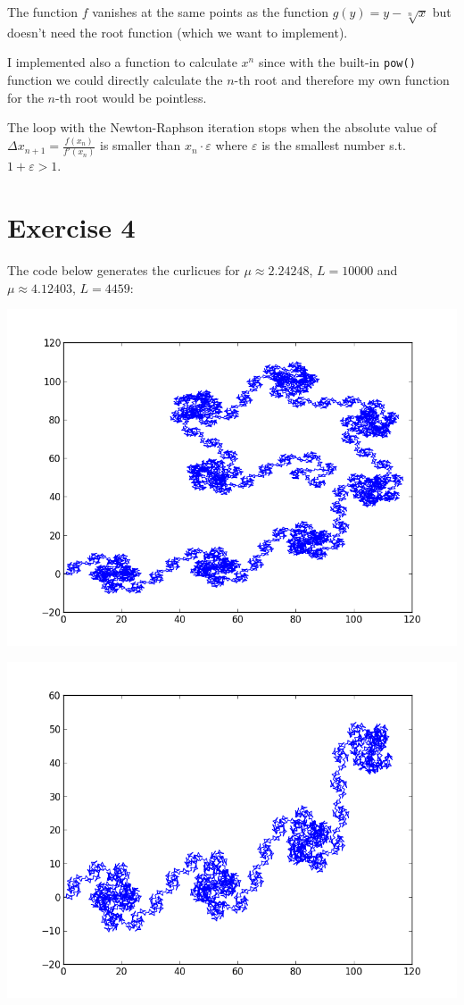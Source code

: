 \documentclass[%
]
{scrartcl}
\theoremstyle{plain}
\begin{document}
The function $f$ vanishes at the same points as the function $g(y)=y-\sqrt[n]{x}$ but doesn't need the root function (which we want to implement).

I implemented also a function to calculate $x^{n}$ since with the built-in \texttt{pow()} function we could directly calculate the $n$-th root and therefore my own function for the $n$-th root would be pointless.

The loop with the Newton-Raphson iteration stops when the absolute value of $\Delta x_{n+1}=\frac{f(x_{n})}{f'(x_{n})}$ is smaller than $x_{n}\cdot\varepsilon$ where $\varepsilon$ is the smallest number s.t. $1+\varepsilon>1$.



\section*{Exercise 4}

The code below generates the curlicues for $\mu\approx 2.24248$, $L=10000$ and $\mu\approx 4.12403$, $L=4459$:



\begin{center}
\includegraphics[width=0.6\linewidth]{../curlicue01.png}
\end{center}

\begin{center}
\centering
\includegraphics[width=0.6\linewidth]{../curlicue02.png}
\end{center}
\end{document}
